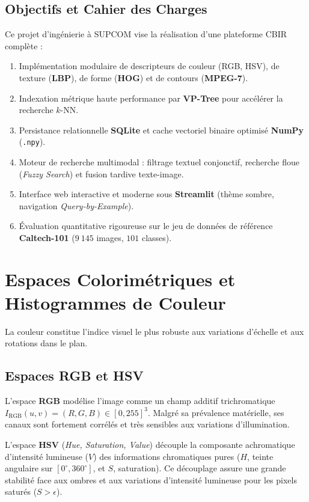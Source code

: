 \subsection{Objectifs et Cahier des Charges}
Ce projet d'ingénierie à SUPCOM vise la réalisation d'une plateforme CBIR complète :
\begin{enumerate}[nosep]
    \item Implémentation modulaire de descripteurs de couleur (RGB, HSV), de texture (\textbf{LBP}), de forme (\textbf{HOG}) et de contours (\textbf{MPEG-7}).
    \item Indexation métrique haute performance par \textbf{VP-Tree} pour accélérer la recherche $k$-NN.
    \item Persistance relationnelle \textbf{SQLite} et cache vectoriel binaire optimisé \textbf{NumPy} (\texttt{.npy}).
    \item Moteur de recherche multimodal : filtrage textuel conjonctif, recherche floue (\textit{Fuzzy Search}) et fusion tardive texte-image.
    \item Interface web interactive et moderne sous \textbf{Streamlit} (thème sombre, navigation \textit{Query-by-Example}).
    \item Évaluation quantitative rigoureuse sur le jeu de données de référence \textbf{Caltech-101} ($9~145$ images, $101$ classes).
\end{enumerate}

\section{Espaces Colorimétriques et Histogrammes de Couleur}

La couleur constitue l'indice visuel le plus robuste aux variations d'échelle et aux rotations dans le plan.

\subsection{Espaces RGB et HSV}
L'espace \textbf{RGB} modélise l'image comme un champ additif trichromatique $I_{\text{RGB}}(u, v) = (R, G, B) \in [0, 255]^3$. Malgré sa prévalence matérielle, ses canaux sont fortement corrélés et très sensibles aux variations d'illumination.

L'espace \textbf{HSV} (\textit{Hue, Saturation, Value}) découple la composante achromatique d'intensité lumineuse ($V$) des informations chromatiques pures ($H$, teinte angulaire sur $[0^\circ, 360^\circ]$, et $S$, saturation). Ce découplage assure une grande stabilité face aux ombres et aux variations d'intensité lumineuse pour les pixels saturés ($S > \epsilon$).

